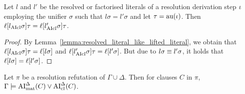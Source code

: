 \documentclass[,%
	draft=false,%
	numbers=noendperiod
	11pt,
	a4paper,
	oneside,%
	openany,
]{memoir}
\begin{document}
\begin{lemma}
	\label{lemma:resolved_literals_equal}
	Let $l$ and $l'$ be the resolved or factorised literals of a resolution derivation step $\iota$ employing the unifier $\sigma$ such that $l\sigma = l'\sigma$ and let $\tau =\nolinebreak \aiu(\inference)$.
	Then $\ell[l_{\operatorname{AIcl}}\sigma]\tau = \ell[l_{\operatorname{AIcl}}'\sigma]\tau$.
\end{lemma}
\begin{proof}
	By Lemma~\ref{lemma:resolved_literal_like_lifted_literal}, 
	we obtain that 
	$\ell[l_{\operatorname{AIcl}}\sigma]\tau = \ell[l\sigma]$ and
	$\ell[l'_{\operatorname{AIcl}}\sigma]\tau = \ell[l'\sigma]$.
	But due to $l\sigma \equiv l'\sigma$, it holds that
	$\ell[l\sigma] = \ell[l'\sigma]$.
\end{proof}


\begin{lemma}
	\label{lemma:gamma_entails_aide}
	Let $\pi$ be a resolution refutation of $\Gamma\cup\Delta$.
	Then for clauses $C$ in\nolinebreak{} $\pi$,
	$\Gamma\entails\nolinebreak \AImatde(C) \lor\nolinebreak \AIclde(C)$.
\end{lemma}
\end{document}
